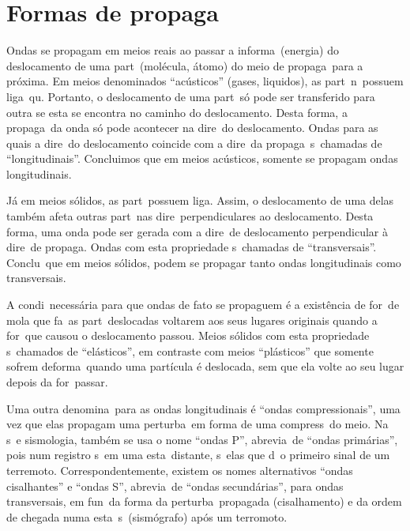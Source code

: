 \section{Formas de propaga\cao}

Ondas se propagam em meios reais ao passar a informa\cao\ (energia) do 
deslocamento de uma part\icula\ (mol\'ecula, \'atomo) do meio de
propaga\cao\ para a pr\'oxima. Em meios denominados ``ac\'usticos''
(gases, liquidos), as part\iculas\ n\ao\ possuem liga\coes\ qu\imicas.
Portanto, o deslocamento de uma part\icula\ s\'o pode ser transferido para
outra se esta se encontra no caminho do deslocamento. Desta forma, a
propaga\cao\ da onda s\'o pode acontecer na dire\cao\ do deslocamento.
Ondas para as quais a dire\cao\ do deslocamento coincide com a dire\cao\
da propaga\cao\ s\ao\ chamadas de ``longitudinais''. Concluimos que em
meios ac\'usticos, somente se propagam ondas longitudinais.

J\'a em meios s\'olidos, as part\iculas\ possuem liga\coes. Assim, o
deslocamento de uma delas tamb\'em afeta outras part\iculas\ nas
dire\coes\ perpendiculares ao deslocamento. Desta forma, uma onda pode ser gerada com a
dire\cao\ de deslocamento perpendicular \`a dire\cao\ de propaga\cao.
Ondas com esta propriedade s\ao\ chamadas de ``transversais''.
Conclu\imos\ que em meios s\'olidos, podem se propagar tanto ondas
longitudinais como transversais.

A condi\cao\ necess\'aria para que ondas de fato se propaguem \'e a
exist\^encia de for\cas\ de mola que fa\cam\ as part\iculas\ deslocadas
voltarem aos seus lugares originais quando a for\ca\ que causou o
deslocamento passou. Meios s\'olidos com esta propriedade s\ao\ chamados
de ``el\'asticos'', em contraste com meios ``pl\'asticos'' que
somente sofrem deforma\cao\ quando uma part\'icula \'e deslocada, sem que ela
volte ao seu lugar depois da for\ca\ passar.

Uma outra denomina\cao\ para as ondas longitudinais \'e ``ondas
compressionais'', uma vez que elas propagam uma perturba\cao\ em forma
de uma compress\ao\ do meio. Na s\ismica\ e sismologia, tamb\'em se usa o
nome ``ondas P'', abrevia\cao\ de ``ondas prim\'arias'', pois
num registro s\ismico\ em uma esta\cao\ distante, s\ao\ elas que d\ao\ o
primeiro sinal de um terremoto. Correspondentemente, existem os nomes
alternativos ``ondas cisalhantes'' e ``ondas S'', abrevia\cao\ de
``ondas secund\'arias'', para ondas transversais, em fun\cao\ da forma
da perturba\cao\ propagada (cisalhamento) e da ordem de chegada numa
esta\cao\ s\ismica\ (sism\'ografo) ap\'os um terromoto.

